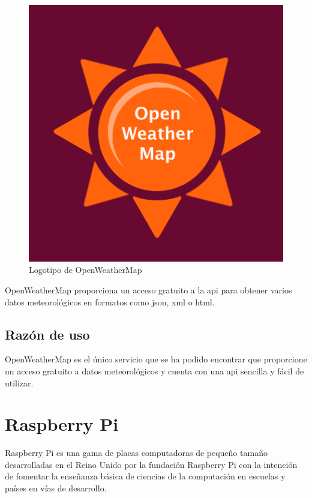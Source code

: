 \begin{figure}[!htbp]
	\centering
	\includegraphics[scale=0.35]{fig/openweathermap_logo}
	\caption{Logotipo de OpenWeatherMap}
\end{figure}

\FloatBarrier

OpenWeatherMap proporciona un acceso gratuito a la \acrshort{api} para obtener varios datos meteorológicos en formatos como \acrshort{json}, \acrshort{xml} o \acrshort{html}.

\subsection{Razón de uso}

OpenWeatherMap es el único servicio que se ha podido encontrar que proporcione un acceso gratuito a datos meteorológicos y cuenta con una \acrshort{api} sencilla y fácil de utilizar.

\section{Raspberry Pi}

Raspberry Pi es una gama de placas computadoras de pequeño tamaño desarrolladas en el Reino Unido por la fundación Raspberry Pi\cite{Raspberry} con la intención de fomentar la enseñanza básica de ciencias de la computación en escuelas y países en vías de desarrollo.


